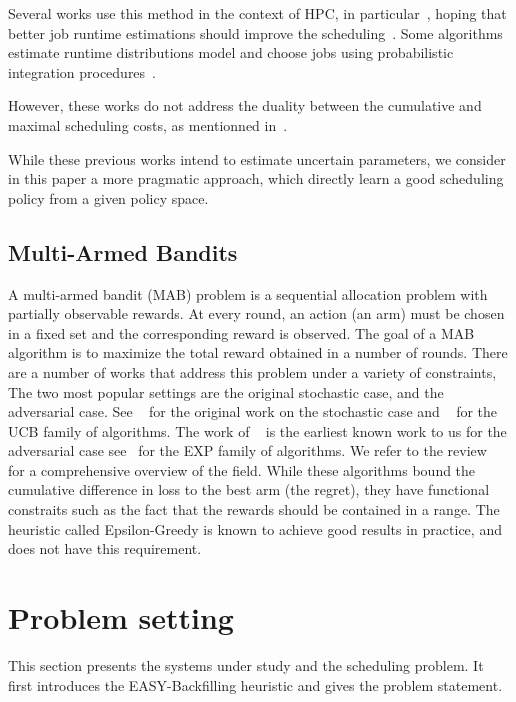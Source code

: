 \documentclass[sigconf]{acmart}
\begin{document}
Several works use this method in the context of HPC, in
particular~\cite{Tsafrir_easypp_2005,learningruntimes}, hoping that better job
runtime estimations should improve the scheduling~\cite{chiang_impact_2002}.
Some algorithms estimate runtime distributions model and choose jobs using
probabilistic integration procedures~\cite{Nissimov2008}.

However, these works do not address the duality between the cumulative and
maximal scheduling costs, as mentionned in~\cite{learningruntimes}.

While these previous works intend to estimate uncertain parameters, we consider in this paper a more
pragmatic approach, which directly learn a good scheduling policy from a given policy space.

\subsection{Multi-Armed Bandits}

A multi-armed bandit (MAB) problem is a sequential allocation problem with
partially observable rewards. At every round, an action (an arm) must be chosen
in a fixed set and the corresponding reward is observed. The goal of a MAB
algorithm is to maximize the total reward obtained in a number of rounds.
There are a number of works that address this problem under a variety of
constraints, The two most popular settings are the original stochastic  case,
and the adversarial case. See ~\cite{thompson} for the original work on the
stochastic case and ~\cite{Auer2002} for the UCB family of algorithms. The work
of ~\cite{Banos} is the earliest known work to us for the adversarial case
see~\cite{nonstoch} for the EXP family of algorithms. We refer to the
review~\cite{bubnow} for a comprehensive overview of the field. While these
algorithms bound the cumulative difference in loss to the best arm (the
regret), they have functional constraits such as the fact that the rewards
should be contained in a range. The\cite{Auer2002} heuristic called
Epsilon-Greedy is known to achieve good results in practice, and does not have
this requirement.

\section{Problem setting}
\label{sec:problem_setting}

This section presents the systems under study and the scheduling problem.  It
first introduces the EASY-Backfilling heuristic and gives  the
problem statement.
\end{document}
